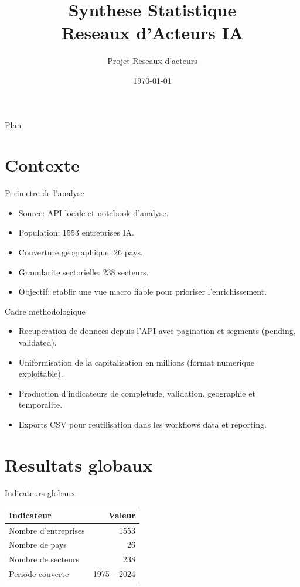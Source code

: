 \documentclass[aspectratio=169]{beamer}
\title{Synthese Statistique\\Reseaux d'Acteurs IA}
\author{Projet Reseaux d'acteurs}
\date{\today}
\begin{document}
\begin{frame}
  \titlepage
\end{frame}

\begin{frame}{Plan}
\tableofcontents
\end{frame}

\section{Contexte}

\begin{frame}{Perimetre de l'analyse}
\begin{itemize}
  \item Source: API locale et notebook d'analyse.
  \item Population: 1553 entreprises IA.
  \item Couverture geographique: 26 pays.
  \item Granularite sectorielle: 238 secteurs.
  \item Objectif: etablir une vue macro fiable pour prioriser l'enrichissement.
\end{itemize}
\end{frame}

\begin{frame}{Cadre methodologique}
\begin{itemize}
  \item Recuperation de donnees depuis l'API avec pagination et segments (pending, validated).
  \item Uniformisation de la capitalisation en millions (format numerique exploitable).
  \item Production d'indicateurs de completude, validation, geographie et temporalite.
  \item Exports CSV pour reutilisation dans les workflows data et reporting.
\end{itemize}
\end{frame}

\section{Resultats globaux}

\begin{frame}{Indicateurs globaux}
\begin{table}
\centering
\begin{tabular}{lr}
\toprule
Indicateur & Valeur \\
\midrule
Nombre d'entreprises & 1553 \\
Nombre de pays & 26 \\
Nombre de secteurs & 238 \\
Periode couverte & 1975 -- 2024 \\
\bottomrule
\end{tabular}
\end{table}
\end{frame}
\end{document}
